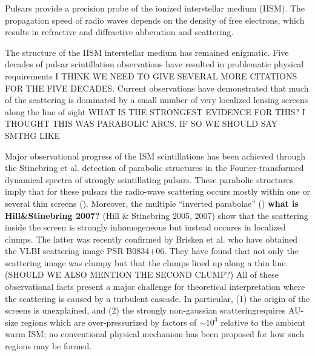 \documentclass[useAMS,usenatbib]{mn2e}
\begin{document}
Pulsars provide a precision probe of the ionized interstellar medium
(IISM).  The propagation speed of radio waves depends on the density
of free electrons, which results in refractive and diffractive
abberation and scattering. 

The structure of the IISM
interstellar medium has remained enigmatic. Five
decades of pulsar scintillation observations \citep{1968Natur.218..920S}
have resulted in problematic physical requirements I THINK WE NEED TO GIVE SEVERAL MORE CITATIONS
FOR THE FIVE DECADES.  Current
observations have demonstrated that much of the scattering is
dominated by a small number of very localized lensing
screens \citep{2010ApJ...708..232B} along the line of sight WHAT IS THE STRONGEST EVIDENCE 
FOR THIS? I THOUGHT THIS WAS PARABOLIC ARCS. IF SO WE SHOULD SAY SMTHG LIKE

Major observational progress of the ISM scintillations has been
achieved through the Stinebring et al.\citet{2001ApJ...549L..97S}
detection of parabolic structures in the Fourier-transformed dynamical
spectra of strongly scintillating pulsars. These parabolic structures
imply that for these pulsars the radio-wave scattering occurs mostly
within one or several thin screens
(\cite{2004MNRAS.354...43W,2006ApJ...637..346C,2008MNRAS.388.1214W}).
Moreover, the multiple ``inverted
parabolae'' (\cite{2005ApJ...619L.171H})
{\bf what is Hill\&Stinebring 2007?}
(Hill \& Stinebring 2005, 2007) show that the scattering
inside the screen is strongly inhomogeneous but instead occures in
localized clumps. The latter was recently confirmed by Brisken et
al.\cite{2010ApJ...708..232B} who have obtained the VLBI scattering
image PSR B0834+06. They
have found that not only the scattering image was clumpy but that the
clumps lined up along a thin line.
(SHOULD WE ALSO MENTION THE
SECOND CLUMP?)
All of these
observational facts present a major challenge for theoretical
interpretation where the scattering is caused by a turbulent
cascade. In particular, (1) the origin of the screens is unexplained,
and (2) the strongly non-gaussian scatteringrequires AU-size
regions which are over-pressurized by factors of $\sim 10^3$
relative to the ambient warm ISM\cite{1987Natur.328..324R}; no conventional
physical mechanism has been proposed for how such regions may be
formed.
\end{document}
